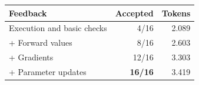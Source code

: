 \begin{tabular*}{\linewidth}{@{\extracolsep{\fill}}lrr@{}}
\toprule
\textbf{Feedback} & \textbf{Accepted} & \textbf{Tokens} \\
\midrule
Execution and basic checks & 4/16 & 2.089 \\
\quad + Forward values & 8/16 & 2.603 \\
\quad + Gradients & 12/16 & 3.303 \\
\quad + Parameter updates & \textbf{16/16} & 3.419 \\
\bottomrule
\end{tabular*}
